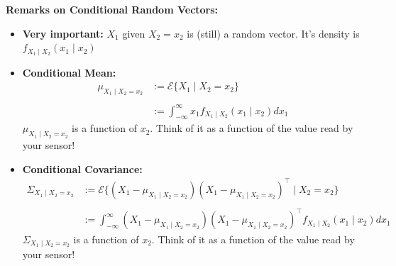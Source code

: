 \documentclass[letterpaper]{article}
\newcommand{\E}{\mathcal{E}}
\begin{document}
       \textbf{Remarks on Conditional Random Vectors:}
        \begin{itemize}

        \item \textbf{Very important:} $X_1$ given $X_2=x_2$ is (still) a random vector. It's density is $f_{X_1\mid X_2}(x_1 \mid x_2)$

        \item \textbf{Conditional Mean:} \begin{align*} \mu_{X_1 \mid X_2=x_2}&:=\E \{ X_1 \mid X_2=x_2\}  \\ \\ &:=\int_{-\infty}^{\infty} x_1 f_{X_1\mid X_2}(x_1 \mid x_2) dx_1
            \end{align*}
            $\mu_{X_1 \mid X_2=x_2}$ is a function of $x_2$. Think of it as a function of the value read by your sensor!

         \item  \textbf{Conditional Covariance:} \begin{align*} \Sigma_{X_1 \mid X_2=x_2} & := \E \{ (X_1 -\mu_{X_1 \mid X_2=x_2})(X_1 -\mu_{X_1 \mid X_2=x_2})^\top \mid X_2=x_2 \} \\ \\ &:=\int_{-\infty}^{\infty} (X_1 -\mu_{X_1 \mid X_2=x_2})(X_1 -\mu_{X_1 \mid X_2=x_2})^\top f_{X_1\mid X_2}(x_1 \mid x_2) dx_1
            \end{align*}
            $\Sigma_{X_1 \mid X_2=x_2}$ is a function of $x_2$. Think of it as a function of the value read by your sensor!

        \end{itemize}
\end{document}
